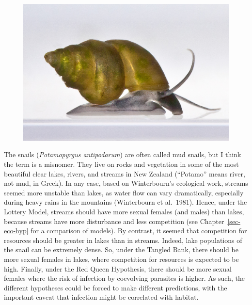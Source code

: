 \documentclass[
  letterpaper,
]{book}
\begin{document}
\begin{figure}


{\centering \includegraphics{images/fig3-4.jpeg}

}

\end{figure}

The snails (\emph{Potamopyrgus antipodarum}) are often called mud
snails, but I think the term is a misnomer. They live on rocks and
vegetation in some of the most beautiful clear lakes, rivers, and
streams in New Zealand (``Potamo'' means river, not mud, in Greek). In
any case, based on Winterbourn's ecological work, streams seemed more
unstable than lakes, as water flow can vary dramatically, especially
during heavy rains in the mountains (Winterbourn et al.~1981). Hence,
under the Lottery Model, streams should have more sexual females (and
males) than lakes, because streams have more disturbance and less
competition (see Chapter~\ref{sec-eco-hyp} for a comparison of models).
By contrast, it seemed that competition for resources should be greater
in lakes than in streams. Indeed, lake populations of the snail can be
extremely dense. So, under the Tangled Bank, there should be more sexual
females in lakes, where competition for resources is expected to be
high. Finally, under the Red Queen Hypothesis, there should be more
sexual females where the risk of infection by coevolving parasites is
higher. As such, the different hypotheses could be forced to make
different predictions, with the important caveat that infection might be
correlated with habitat.
\end{document}
